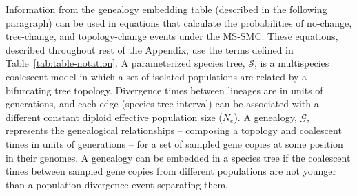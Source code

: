 \documentclass[11pt]{article}
\begin{document}
Information from the genealogy embedding table (described in the following paragraph) can be used 
in equations that 
calculate the 
probabilities of no-change, tree-change, and topology-change events under the 
MS-SMC. These equations, described throughout rest of the Appendix, use the terms defined in 
Table~\ref{tab:table-notation}. 
A parameterized species tree, $\mathcal{S}$, is a multispecies coalescent 
model in which a set of isolated populations are related by a bifurcating
tree topology. Divergence times between lineages are in units of generations, 
and each edge (species tree interval) can be associated with a different constant 
diploid effective population size ($N_e$). 
A genealogy, $\mathcal{G}$, represents the genealogical relationships -- composing
a topology and coalescent times in units of generations -- for a set 
of sampled gene copies at some position in their genomes. A genealogy can be 
embedded in a species tree if the coalescent times between sampled gene copies
from different populations are not younger than a population divergence
event separating them.
\end{document}

